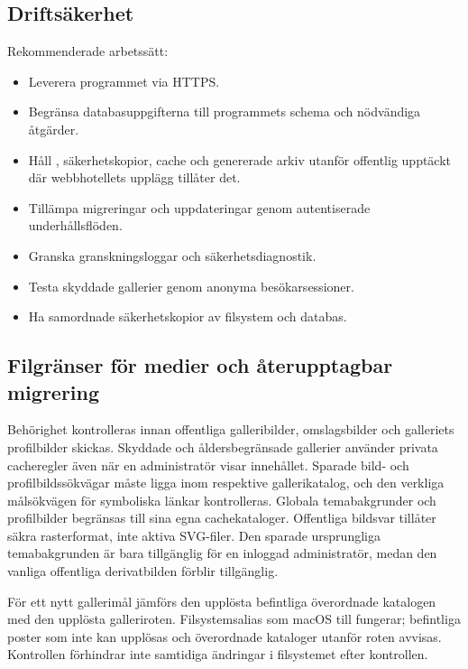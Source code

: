 \documentclass[11pt,a4paper]{article}
\newcommand{\filepath}[1]{\path{#1}}
\begin{document}
\subsection{Driftsäkerhet}

Rekommenderade arbetssätt:

\begin{itemize}
  \item Leverera programmet via HTTPS.
  \item Begränsa databasuppgifterna till programmets schema och nödvändiga
  åtgärder.
  \item Håll \filepath{config.php}, säkerhetskopior, cache och genererade arkiv
  utanför offentlig upptäckt där webbhotellets upplägg tillåter det.
  \item Tillämpa migreringar och uppdateringar genom autentiserade
  underhållsflöden.
  \item Granska granskningsloggar och säkerhetsdiagnostik.
  \item Testa skyddade gallerier genom anonyma besökarsessioner.
  \item Ha samordnade säkerhetskopior av filsystem och databas.
\end{itemize}
\subsection{Filgränser för medier och återupptagbar migrering}

Behörighet kontrolleras innan offentliga galleribilder, omslagsbilder och
galleriets profilbilder skickas. Skyddade och åldersbegränsade gallerier
använder privata cacheregler även när en administratör visar innehållet. Sparade
bild- och profilbildssökvägar måste ligga inom respektive gallerikatalog, och
den verkliga målsökvägen för symboliska länkar kontrolleras. Globala
temabakgrunder och profilbilder begränsas till sina egna cachekataloger.
Offentliga bildsvar tillåter säkra rasterformat, inte aktiva SVG-filer. Den
sparade ursprungliga temabakgrunden är bara tillgänglig för en inloggad
administratör, medan den vanliga offentliga derivatbilden förblir tillgänglig.

För ett nytt gallerimål jämförs den upplösta befintliga överordnade katalogen
med den upplösta galleriroten. Filsystemsalias som macOS \filepath{/var} till
\filepath{/private/var} fungerar; befintliga poster som inte kan upplösas och
överordnade kataloger utanför roten avvisas. Kontrollen förhindrar inte
samtidiga ändringar i filsystemet efter kontrollen.
\end{document}
